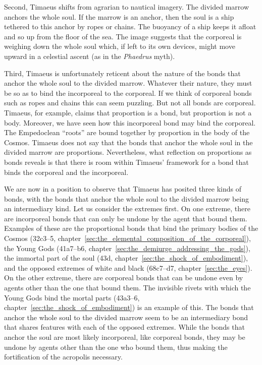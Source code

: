 Second, Timaeus shifts from agrarian to nautical imagery. The divided marrow anchors the whole soul. If the marrow is an anchor, then the soul is a ship tethered to this anchor by ropes or chains. The buoyancy of a ship keeps it afloat and so up from the floor of the sea. The image suggests that the corporeal is weighing down the whole soul which, if left to its own devices, might move upward in a celestial ascent (as in the \emph{Phaedrus} myth).

Third, Timaeus is unfortunately reticent about the nature of the bonds that anchor the whole soul to the divided marrow. Whatever their nature, they must be so as to bind the incorporeal to the corporeal. If we think of corporeal bonds such as ropes and chains this can seem puzzling. But not all bonds are corporeal. Timaeus, for example, claims that proportion is a bond, but proportion is not a body. Moreover, we have seen how this incorporeal bond may bind the corporeal. The Empedoclean ``roots'' are bound together by proportion in the body of the Cosmos. Timaeus does not say that the bonds that anchor the whole soul in the divided marrow are proportions. Nevertheless, what reflection on proportions as bonds reveals is that there is room within Timaeus' framework for a bond that binds the corporeal and the incorporeal.

We are now in a position to observe that Timaeus has posited three kinds of bonds, with the bonds that anchor the whole soul to the divided marrow being an intermediary kind. Let us consider the extremes first. On one extreme, there are incorporeal bonds that can only be undone by the agent that bound them. Examples of these are the proportional bonds that bind the primary bodies of the Cosmos  (32c3--5, chapter~\ref{sec:the_elemental_composition_of_the_corporeal}), the Young Gods (41a7--b6, chapter~\ref{sec:the_demiurge_addressing_the_gods}), the immortal part of the soul (43d, chapter~\ref{sec:the_shock_of_embodiment}), and the opposed extremes of white and black (68c7–d7, chapter~\ref{sec:the_eyes}). On the other extreme, there are corporeal bonds that can be undone even by agents other than the one that bound them. The invisible rivets with which the Young Gods bind the mortal parts (43a3–6, chapter~\ref{sec:the_shock_of_embodiment}) is an example of this. The bonds that anchor the whole soul to the divided marrow seem to be an intermediary bond that shares features with each of the opposed extremes. While the bonds that anchor the soul are most likely incorporeal, like corporeal bonds, they may be undone by agents other than the one who bound them, thus making the fortification of the acropolis necessary.

